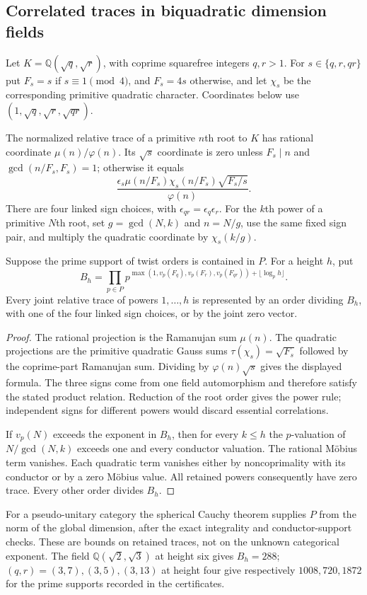 \subsection{Correlated traces in biquadratic dimension fields}
Let $K=\mathbb Q(\sqrt q,\sqrt r)$, with coprime squarefree integers
$q,r>1$. For $s\in\{q,r,qr\}$ put $F_s=s$ if $s\equiv1\pmod4$,
and $F_s=4s$ otherwise, and let $\chi_s$ be the corresponding primitive
quadratic character. Coordinates below use
$(1,\sqrt q,\sqrt r,\sqrt{qr})$.

\begin{proposition}
\label{prop:m3-biquadratic-traces}
The normalized relative trace of a primitive $n$th root to $K$ has rational
coordinate $\mu(n)/\varphi(n)$. Its $\sqrt s$ coordinate is zero unless
$F_s\mid n$ and $\gcd(n/F_s,F_s)=1$; otherwise it equals
\[
 \frac{\epsilon_s\mu(n/F_s)\chi_s(n/F_s)\sqrt{F_s/s}}
      {\varphi(n)}.
\]
There are four linked sign choices, with
$\epsilon_{qr}=\epsilon_q\epsilon_r$.
For the $k$th power of a primitive $N$th root, set $g=\gcd(N,k)$ and
$n=N/g$, use the same fixed sign pair, and multiply the quadratic
coordinate by $\chi_s(k/g)$.

Suppose the prime support of twist orders is contained in $P$.
For a height $h$, put
\[
 B_h=\prod_{p\in P}
 p^{\max(1,v_p(F_q),v_p(F_r),v_p(F_{qr}))+\lfloor\log_p h\rfloor}.
\]
Every joint relative trace of powers $1,\ldots,h$ is represented by an
order dividing $B_h$, with one of the four linked sign choices, or by
the joint zero vector.
\end{proposition}
\begin{proof}
The rational projection is the Ramanujan sum $\mu(n)$. The quadratic
projections are the primitive quadratic Gauss sums
$\tau(\chi_s)=\sqrt{F_s}$ followed by the coprime-part Ramanujan sum.
Dividing by $\varphi(n)\sqrt s$ gives the displayed formula.
The three signs come from one field automorphism and therefore satisfy
the stated product relation. Reduction of the root order gives the power
rule; independent signs for different powers would discard essential
correlations.

If $v_p(N)$ exceeds the exponent in $B_h$, then for every $k\leq h$
the $p$-valuation of $N/\gcd(N,k)$ exceeds one and every conductor
valuation. The rational M\"obius term vanishes. Each quadratic term
vanishes either by noncoprimality with its conductor or by a zero
M\"obius value. All retained powers consequently have zero trace.
Every other order divides $B_h$.
\end{proof}
For a pseudo-unitary category the spherical Cauchy theorem
\cite{BNRWCauchy} supplies $P$ from the norm of the global dimension, after
the exact integrality and conductor-support checks. These are bounds on
retained traces, not on the unknown categorical exponent.
The field $\mathbb Q(\sqrt2,\sqrt3)$ at height six gives $B_h=288$;
$(q,r)=(3,7),(3,5),(3,13)$ at height four give respectively
$1008,720,1872$ for the prime supports recorded in the certificates.

